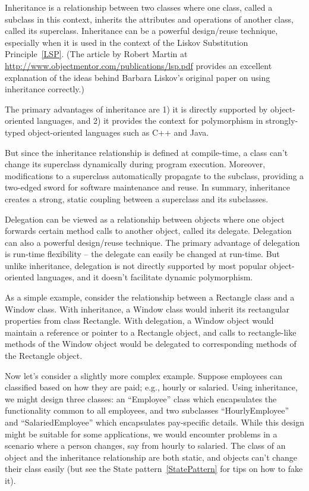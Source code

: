 \documentclass{book}
\begin{document}
Inheritance is a relationship between two classes where one class, called a subclass in this context, inherits the attributes and operations of another class, called its superclass.
Inheritance can be a powerful design/reuse technique, especially when it is used in the context of the Liskov Substitution Principle~\ref{LSP}.
(The article by Robert Martin at \url{http://www.objectmentor.com/publications/lsp.pdf} provides an excellent explanation of the ideas behind
Barbara Liskov’s original paper on using inheritance correctly.) 

The primary advantages of inheritance are 1) it is directly supported by object-oriented languages, and
2) it provides the context for polymorphism in strongly-typed object-oriented languages such as C++ and Java.

But since the inheritance relationship is defined at compile-time, a class can’t change its superclass dynamically during program execution.
Moreover, modifications to a superclass automatically propagate to the subclass, providing a two-edged sword for software maintenance and reuse.
In summary, inheritance creates a strong, static coupling between a superclass and its subclasses.

Delegation can be viewed as a relationship between objects where one object forwards certain method calls to another object, called its delegate.
Delegation can also a powerful design/reuse technique. The primary advantage of delegation is run-time flexibility – the delegate can easily be changed at run-time.
But unlike inheritance, delegation is not directly supported by most popular object-oriented languages, and it doesn’t facilitate dynamic polymorphism.

As a simple example, consider the relationship between a Rectangle class and a Window class.
With inheritance, a Window class would inherit its rectangular properties from class Rectangle.
With delegation, a Window object would maintain a reference or pointer to a Rectangle object, 
and calls to rectangle-like methods of the Window object would be delegated to corresponding methods of the Rectangle object.

Now let’s consider a slightly more complex example.
Suppose employees can classified based on how they are paid; e.g., hourly or salaried.
Using inheritance, we might design three classes: an ``Employee'' class which encapsulates the functionality common to all employees,
and two subclasses ``HourlyEmployee'' and ``SalariedEmployee'' which encapsulates pay-specific details. While this design might be suitable for some applications,
we would encounter problems in a scenario where a person changes, say from hourly to salaried.
The class of an object and the inheritance relationship are both static, and objects can’t change their class easily (but see the State pattern~\ref{StatePattern} for tips on how to fake it).
\end{document}
